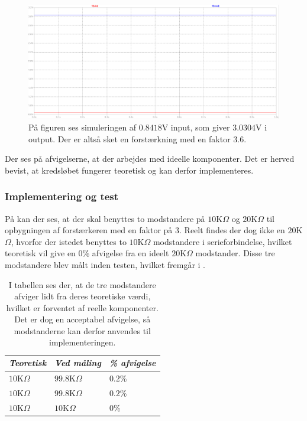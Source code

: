 \begin{figure}[H]
	\centering
	\includegraphics[scale=0.3]{figures/cProblemloesning/Forstaerker_faktor3_simulering.PNG}
	\caption{På figuren ses simuleringen af $0.8418$V input, som giver $3.0304$V i output. Der er altså sket en forstærkning med en faktor $3.6$.}
	\label{fig:faktor3_simulering}
\end{figure}
\noindent Der ses på afvigelserne, at der arbejdes med ideelle komponenter. Det er herved bevist, at kredsløbet fungerer teoretisk og kan derfor implementeres.

\subsubsection{Implementering og test}
På  kan der ses, at der skal benyttes to modstandere på $10$K$\Omega$ og $20$K$\Omega$ til opbygningen af forstærkeren med en faktor på 3. Reelt findes der dog ikke en $20$K$\Omega$, hvorfor der istedet benyttes to $10$K$\Omega$ modstandere i serieforbindelse, hvilket teoretisk vil give en $0$\% afvigelse fra en ideelt $20$K$\Omega$ modstander. Disse tre modstandere blev målt inden testen, hvilket fremgår i .
\begin{table}[H]
	\centering
	\begin{tabular}{|l|l|l|}
		\hline
		\textit{Teoretisk}  & \textit{Ved måling} & \textit{\% afvigelse} \\ \hline
		$10$K$\Omega$       & $99.8$K$\Omega$     & $0.2$\%               \\ \hline
		$10$K$\Omega$       & $99.8$K$\Omega$     & $0.2$\%               \\ \hline
		$10$K$\Omega$       & $10$K$\Omega$       & $0$\%               \\ \hline
	\end{tabular}
	\caption{I tabellen ses der, at de tre modstandere afviger lidt fra deres teoretiske værdi, hvilket er forventet af reelle komponenter. Det er dog en acceptabel afvigelse, så modstanderne kan derfor anvendes til implementeringen.}
	\label{Tab:modstand_faktor18}
\end{table}

